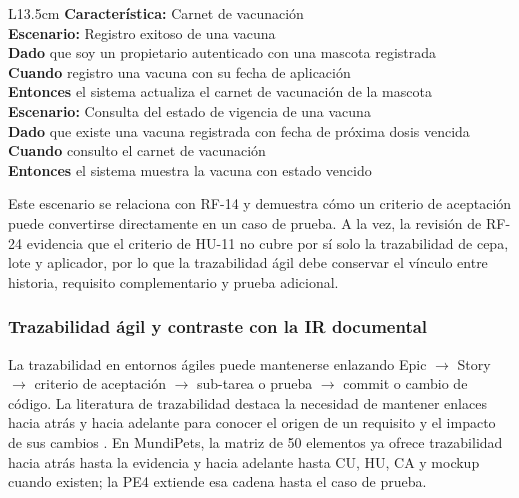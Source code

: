 \documentclass[journal,onecolumn]{IEEEtran}
\begin{document}
	\begin{table}[H]
		\centering
		\caption{Criterio de aceptación en formato Gherkin tomado de HU-11 del ERS de MundiPets}
		\label{tab:gherkin}
		\begin{tabular}{L{13.5cm}}
			\toprule
			\textbf{Característica:} Carnet de vacunación \\
			\addlinespace
			\textbf{Escenario:} Registro exitoso de una vacuna \\
			\textbf{Dado} que soy un propietario autenticado con una mascota registrada \\
			\textbf{Cuando} registro una vacuna con su fecha de aplicación \\
			\textbf{Entonces} el sistema actualiza el carnet de vacunación de la mascota \\
			\addlinespace
			\textbf{Escenario:} Consulta del estado de vigencia de una vacuna \\
			\textbf{Dado} que existe una vacuna registrada con fecha de próxima dosis vencida \\
			\textbf{Cuando} consulto el carnet de vacunación \\
			\textbf{Entonces} el sistema muestra la vacuna con estado vencido \\
			\bottomrule
		\end{tabular}
	\end{table}
	
	Este escenario se relaciona con RF-14 y demuestra cómo un criterio de aceptación puede convertirse
	directamente en un caso de prueba. A la vez, la revisión de RF-24 evidencia que el criterio de
	HU-11 no cubre por sí solo la trazabilidad de cepa, lote y aplicador, por lo que la trazabilidad
	ágil debe conservar el vínculo entre historia, requisito complementario y prueba adicional.
	
	\subsubsection{Trazabilidad ágil y contraste con la IR documental}
	
	La trazabilidad en entornos ágiles puede mantenerse enlazando Epic $\rightarrow$ Story
	$\rightarrow$ criterio de aceptación $\rightarrow$ sub-tarea o prueba $\rightarrow$ commit o
	cambio de código. La literatura de trazabilidad destaca la necesidad de mantener enlaces hacia
	atrás y hacia adelante para conocer el origen de un requisito y el impacto de sus cambios
	\cite{gotel1994, clelandhuang2012}. En MundiPets, la matriz de 50 elementos ya ofrece trazabilidad
	hacia atrás hasta la evidencia y hacia adelante hasta CU, HU, CA y mockup cuando existen; la PE4
	extiende esa cadena hasta el caso de prueba.
	
\end{document}
